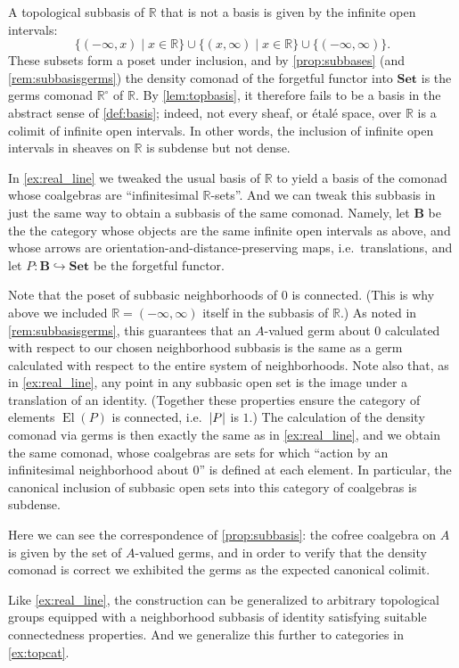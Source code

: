 \documentclass[11pt, oneside, article]{memoir}
\theoremstyle{plain}
\theoremstyle{definition}
\theoremstyle{remark}
\newenvironment{example}
{\renewcommand\qedsymbol{$\lrcorner$}%
  \pushQED{\qed}\myexample}
{\popQED\endmyexample}
\DeclareMathOperator{\El}{El}
\DeclarePairedDelimiter{\abs}{\lvert}{\rvert}
\newcommand{\namedcat}[1]{\mathbf{#1}}
\newcommand{\cat}[1]{\mathbf{#1}}
\newcommand{\Set}{\namedcat{Set}}
\newcommand{\pts}[1]{{\abs{#1}}}
\newcommand{\ph}[1]{#1}
\newcommand{\setof}[1]{\{#1\}}
\newcommand{\xA}{A}
\newcommand{\bB}{\cat{B}}
\newcommand{\pP}{\ph{P}}
\newcommand{\toptocmd}[1]{{{#1}^\circ}}
\newcommand{\rr}{\mathbb{R}}
\begin{document}
\begin{example}[Infinitesimal group actions]\label{ex:infinitesimalsubbasis}
  A topological subbasis of $\rr$ that is not a basis is given by the
  infinite open intervals:
  \[
    \setof{(-\infty,x) \mid x \in \rr}
    \cup
    \setof{(x,\infty) \mid x \in \rr}
    \cup
    \setof{(-\infty,\infty)}.
  \]
  These subsets form a poset under inclusion, and by
  \cref{prop:subbases} (and \cref{rem:subbasisgerms}) the density
  comonad of the forgetful functor into $\Set$ is the germs comonad
  $\toptocmd{\rr}$ of $\rr$. By \cref{lem:topbasis}, it therefore
  fails to be a basis in the abstract sense of \cref{def:basis};
  indeed, not every sheaf, or \'etal\'e space, over $\rr$ is a
  colimit of infinite open intervals. In other words, the inclusion of
  infinite open intervals in sheaves on $\rr$ is subdense but not
  dense.

  In \cref{ex:real_line} we tweaked the usual basis of $\rr$ to yield
  a basis of the comonad whose coalgebras are ``infinitesimal
  $\rr$-sets''. And we can tweak this subbasis in just the same way to
  obtain a subbasis of the same comonad. Namely, let $\bB$ be the the
  category whose objects are the same infinite open intervals as
  above, and whose arrows are orientation-and-distance-preserving
  maps, i.e.\ translations, and let
  $\pP \colon \bB \hookrightarrow \Set$ be the forgetful functor.
  
  Note that the poset of subbasic neighborhoods of $0$ is connected.
  (This is why above we included $\rr = (-\infty,\infty)$ itself in
  the subbasis of $\rr$.) As noted in \cref{rem:subbasisgerms}, this
  guarantees that an $\xA$-valued germ about $0$ calculated with
  respect to our chosen neighborhood subbasis is the same as a germ
  calculated with respect to the entire system of neighborhoods. Note
  also that, as in \cref{ex:real_line}, any point in any subbasic open
  set is the image under a translation of an identity. (Together these
  properties ensure the category of elements $\El(\pP)$ is connected,
  i.e.\ $\pts{\pP}$ is $1$.) The calculation of the density comonad
  via germs is then exactly the same as in \cref{ex:real_line}, and we
  obtain the same comonad, whose coalgebras are sets for which
  ``action by an infinitesimal neighborhood about $0$'' is defined at
  each element. In particular, the canonical inclusion of subbasic
  open sets into this category of coalgebras is subdense.

  Here we can see the correspondence of \cref{prop:subbasis}: the
  cofree coalgebra on $\xA$ is given by the set of $\xA$-valued germs,
  and in order to verify that the density comonad is correct we
  exhibited the germs as the expected canonical colimit.

  Like \cref{ex:real_line}, the construction can be generalized to
  arbitrary topological groups equipped with a neighborhood subbasis
  of identity satisfying suitable connectedness properties. And we
  generalize this further to categories in \cref{ex:topcat}.
\end{example}
\end{document}
